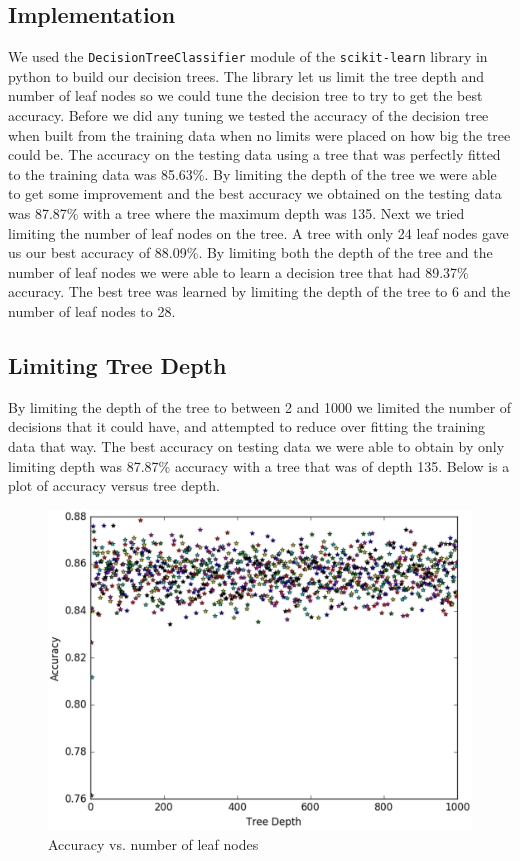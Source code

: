 \documentclass{article} %
\begin{document}
\subsection{Implementation}
We used the \texttt{DecisionTreeClassifier} module of the \texttt{scikit-learn}
library in python to build our decision trees. The library let us limit the tree
depth and number of leaf nodes so we could tune the decision tree to try to get
the best accuracy. Before we did any tuning we tested the accuracy of the decision
tree when built from the training data when no limits were placed on how big the
tree could be. The accuracy on the testing data using a tree that was perfectly
fitted to the training data was 85.63\%. By limiting the depth of the tree we were
able to get some improvement and the best accuracy we obtained on the testing data
was 87.87\% with a tree where the maximum depth was 135. Next we tried limiting
the number of leaf nodes on the tree. A tree with only 24 leaf nodes gave us our
best accuracy of 88.09\%. By limiting both the depth of the tree and the number
of leaf nodes we were able to learn a decision tree that had 89.37\% accuracy.
The best tree was learned by limiting the depth of the tree to 6 and the number
of leaf nodes to 28.

\subsection{Limiting Tree Depth}
By limiting the depth of the tree to between 2 and 1000 we limited the number of
decisions that it could have, and attempted to reduce over fitting the training
data that way. The best accuracy on testing data we were able to obtain by only
limiting depth was 87.87\% accuracy with a tree that was of depth 135. Below is
a plot of accuracy versus tree depth.

\begin{figure}[H]
\includegraphics[scale=.75]{accuracy-vs-depth}
\caption{Accuracy vs. number of leaf nodes}
\end{figure}
\end{document}
